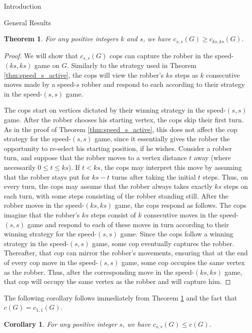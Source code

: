 \documentclass[12pt]{amsart}
\newtheorem{theorem}[lemma]{Theorem}
\newtheorem{corollary}[lemma]{Corollary}
\theoremstyle{definition}
\newcommand{\speeds}{c_{s,s}}
\newcommand{\speed}[1]{c_{#1,#1}}
\begin{document}
\begin{section}{Introduction}
\begin{section}{General Results}
\begin{theorem}\label{thm:speeds_factors_monotone}
For any positive integers $k$ and $s$, we have $\speeds(G) \ge \speed{ks}(G)$.
\end{theorem}
\begin{proof}    
    We will show that $\speeds(G)$ cops can capture the robber in the speed-$(ks,ks)$ game on $G$.  Similarly to the strategy used in Theorem \ref{thm:speed_s_active}, the cops will view the robber's $ks$ steps as $k$ consecutive moves made by a speed-$s$ robber and respond to each according to their strategy in the speed-$(s,s)$ game.  
    
    The cops start on vertices dictated by their winning strategy in the speed-$(s,s)$ game.  After the robber chooses his starting vertex, the cops skip their first turn.  As in the proof of Theorem \ref{thm:speed_s_active}, this does not affect the cop strategy for the speed-$(s,s)$ game, since it essentially gives the robber the opportunity to re-select his starting position, if he wishes.  Consider a robber turn, and suppose that the robber moves to a vertex distance $t$ away (where necessarily $0\le t\le ks$).  If $t<ks$, the cops may interpret this move by assuming that the robber stays put for $ks-t$ turns after taking the initial $t$ steps.  Thus, on every turn, the cops may assume that the robber always takes exactly $ks$ steps on each turn, with some steps consisting of the robber standing still. After the robber moves in the speed-$(ks,ks)$ game, the cops respond as follows.  The cops imagine that the robber's $ks$ steps consist of $k$ consecutive moves in the speed-$(s,s)$ game and respond to each of these moves in turn according to their winning strategy for the speed-$(s,s)$ game.  Since the cops follow a winning strategy in the speed-$(s,s)$ game, some cop eventually captures the robber.  Thereafter, that cop can mirror the robber's movements, ensuring that at the end of every cop move in the speed-$(s,s)$ game, some cop occupies the same vertex as the robber.  Thus, after the corresponding move in the speed-$(ks,ks)$ game, that cop will occupy the same vertex as the robber and will capture him.
\end{proof}

The following corollary follows immediately from Theorem \ref{thm:speeds_factors_monotone} and the fact that $c(G) = \speed{1}(G)$.

\begin{corollary}
For any positive integer $s$, we have $\speeds(G) \le c(G)$.
\end{corollary}


\end{section}
\end{section}
\end{document}
